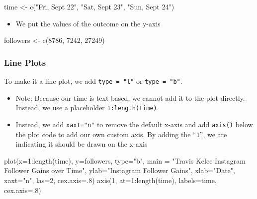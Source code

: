 \documentclass[
  letterpaper,
  DIV=11,
  numbers=noendperiod]{scrreprt}
\newenvironment{Shaded}{\begin{snugshade}}{\end{snugshade}}
\newcommand{\AttributeTok}[1]{\textcolor[rgb]{0.40,0.45,0.13}{#1}}
\newcommand{\DecValTok}[1]{\textcolor[rgb]{0.68,0.00,0.00}{#1}}
\newcommand{\FunctionTok}[1]{\textcolor[rgb]{0.28,0.35,0.67}{#1}}
\newcommand{\NormalTok}[1]{\textcolor[rgb]{0.00,0.23,0.31}{#1}}
\newcommand{\OtherTok}[1]{\textcolor[rgb]{0.00,0.23,0.31}{#1}}
\newcommand{\SpecialCharTok}[1]{\textcolor[rgb]{0.37,0.37,0.37}{#1}}
\newcommand{\StringTok}[1]{\textcolor[rgb]{0.13,0.47,0.30}{#1}}
\providecommand{\tightlist}{%
  \setlength{\itemsep}{0pt}\setlength{\parskip}{0pt}}\usepackage{longtable,booktabs,array}
\begin{document}
\begin{Shaded}
\begin{Highlighting}[]
\NormalTok{time }\OtherTok{\textless{}{-}} \FunctionTok{c}\NormalTok{(}\StringTok{"Fri, Sept 22"}\NormalTok{, }\StringTok{"Sat, Sept 23"}\NormalTok{, }\StringTok{"Sun, Sept 24"}\NormalTok{)}
\end{Highlighting}
\end{Shaded}

\begin{itemize}
\tightlist
\item
  We put the values of the outcome on the y-axis
\end{itemize}

\begin{Shaded}
\begin{Highlighting}[]
\NormalTok{followers }\OtherTok{\textless{}{-}} \FunctionTok{c}\NormalTok{(}\DecValTok{8786}\NormalTok{, }\DecValTok{7242}\NormalTok{, }\DecValTok{27249}\NormalTok{)}
\end{Highlighting}
\end{Shaded}

\hypertarget{line-plots-1}{%
\subsubsection{Line Plots}\label{line-plots-1}}

To make it a line plot, we add \texttt{type\ =\ "l"} or
\texttt{type\ =\ "b"}.

\begin{itemize}
\tightlist
\item
  Note: Because our time is text-based, we cannot add it to the plot
  directly. Instead, we use a placeholder \texttt{1:length(time)}.
\item
  Instead, we add \texttt{xaxt="n"} to remove the default x-axis and add
  \texttt{axis()} below the plot code to add our own custom axis. By
  adding the ``\texttt{1}'', we are indicating it should be drawn on the
  x-axis
\end{itemize}

\begin{Shaded}
\begin{Highlighting}[]
\FunctionTok{plot}\NormalTok{(}\AttributeTok{x=}\DecValTok{1}\SpecialCharTok{:}\FunctionTok{length}\NormalTok{(time), }\AttributeTok{y=}\NormalTok{followers,}
     \AttributeTok{type=}\StringTok{"b"}\NormalTok{,}
     \AttributeTok{main =} \StringTok{"Travis Kelce Instagram Follower Gains over Time"}\NormalTok{,}
     \AttributeTok{ylab=}\StringTok{"Instagram Follower Gains"}\NormalTok{,}
     \AttributeTok{xlab=}\StringTok{"Date"}\NormalTok{,}
     \AttributeTok{xaxt=}\StringTok{"n"}\NormalTok{,}
     \AttributeTok{las=}\DecValTok{2}\NormalTok{, }\AttributeTok{cex.axis=}\NormalTok{.}\DecValTok{8}\NormalTok{)}
\FunctionTok{axis}\NormalTok{(}\DecValTok{1}\NormalTok{, }\AttributeTok{at=}\DecValTok{1}\SpecialCharTok{:}\FunctionTok{length}\NormalTok{(time), }\AttributeTok{labels=}\NormalTok{time, }\AttributeTok{cex.axis=}\NormalTok{.}\DecValTok{8}\NormalTok{)}
\end{Highlighting}
\end{Shaded}
\end{document}
